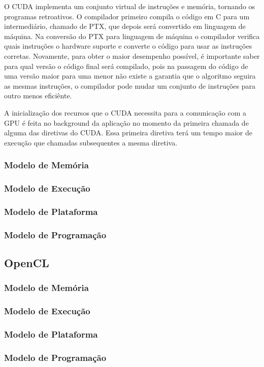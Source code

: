 O CUDA implementa um conjunto virtual de instruções e memória, tornando os programas retroativos. O compilador
primeiro compila o código em C para um intermediário, chamado de PTX, que depois será convertido em linguagem
de máquina. Na conversão do PTX para linguagem de máquina o compilador verifica quais instruções o hardware
suporte e converte o código para usar as instruções corretas. Novamente, para obter o maior desempenho possível,
é importante saber para qual versão o código final será compilado, pois na passagem do código de uma versão
maior para uma menor não existe a garantia que o algoritmo seguira as mesmas instruções, o compilador pode
mudar um conjunto de instruções para outro menos eficiênte.

A inicialização dos recursos que o CUDA necessita para a comunicação com a GPU é feita no background da
aplicação no momento da primeira chamada de alguma das diretivas do CUDA. Essa primeira diretiva terá um
tempo maior de execução que chamadas subsequentes a mesma diretiva.
\subsubsection{Modelo de Memória}

\subsubsection{Modelo de Execução}
\subsubsection{Modelo de Plataforma}
\subsubsection{Modelo de Programação}
\subsection{OpenCL}
\subsubsection{Modelo de Memória}
\subsubsection{Modelo de Execução}
\subsubsection{Modelo de Plataforma}
\subsubsection{Modelo de Programação}

